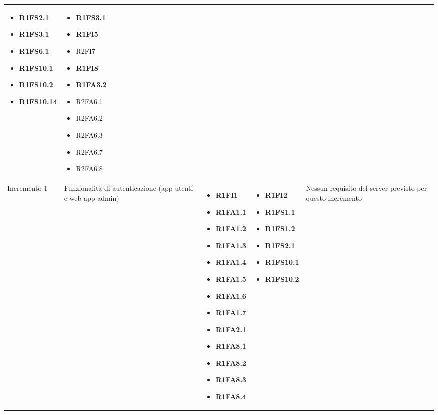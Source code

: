 {\begin{longtable}{C{2.5cm} C{3.2cm} C{2.8cm} C{2.8cm} C{2.8cm}}
\begin{itemize}
    \item[ ] \textbf{R1FS2.1}
    \item[ ] \textbf{R1FS3.1}
    \item[ ] \textbf{R1FS6.1}
    \item[ ] \textbf{R1FS10.1}
    \item[ ] \textbf{R1FS10.2} 
    \item[ ] \textbf{R1FS10.14}
\end{itemize} & \begin{itemize} 
    \item[ ] \textbf{R1FS3.1}
    \item[ ] \textbf{R1FI5}
    \item[ ] R2FI7
    \item[ ] \textbf{R1FI8}
    \item[ ] \textbf{R1FA3.2}
    \item[ ] R2FA6.1
    \item[ ] R2FA6.2
    \item[ ] R2FA6.3
    \item[ ] R2FA6.7
    \item[ ] R2FA6.8
\end{itemize}\\

Incremento 1 & Funzionalità di autenticazione (app utenti e web-app admin) & \begin{itemize}
    \item[ ] \textbf{R1FI1}
    \item[ ] \textbf{R1FA1.1}
    \item[ ] \textbf{R1FA1.2}
    \item[ ] \textbf{R1FA1.3}
    \item[ ] \textbf{R1FA1.4}
    \item[ ] \textbf{R1FA1.5}
    \item[ ] \textbf{R1FA1.6}
    \item[ ] \textbf{R1FA1.7}
    \item[ ] \textbf{R1FA2.1}
    \item[ ] \textbf{R1FA8.1}
    \item[ ] \textbf{R1FA8.2}
    \item[ ] \textbf{R1FA8.3}
    \item[ ] \textbf{R1FA8.4}
\end{itemize} & \begin{itemize} 
    \item[ ] \textbf{R1FI2}
    \item[ ] \textbf{R1FS1.1}
    \item[ ] \textbf{R1FS1.2}
    \item[ ] \textbf{R1FS2.1}
    \item[ ] \textbf{R1FS10.1}
    \item[ ] \textbf{R1FS10.2}
\end{itemize} & 
    Nessun requisito del server previsto per questo incremento \\


\end{longtable}}
